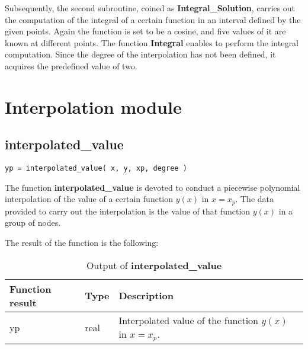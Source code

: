 Subsequently, the second subroutine, coined as \textbf{Integral\_Solution}, carries out the computation of the integral of a certain function in an interval defined by the given points. Again the function is set to be a cosine, and five values of it are known at different points. The function \textbf{Integral} enables to perform the integral computation. Since the degree of the interpolation has not been defined, it acquires the predefined value of two.

\newpage

\par\vspace{\baselineskip}
\lstset{language=Fortran}




\newpage


\section{Interpolation module}


\subsection*{interpolated\_value}


\lstset{language=Fortran}
\begin{lstlisting}[frame=trBL]
yp = interpolated_value( x, y, xp, degree )
\end{lstlisting}

The function \textbf{interpolated\_value} is devoted to conduct a piecewise polynomial interpolation of the value of a certain function $y(x)$ in $x=x_p$. The data provided to carry out the interpolation is the value of that function $y(x)$ in a group of nodes.


The result of the function is the following:

\begin{table}[H]
	\begin{center}
		\begin{spacing}{1.2}
			\begin{tabular}{| l | l | p{6cm} |}
				
				\hline
				
				\bf Function result & \bf Type & \bf Description \\ \hline \hline
				
				yp & real & Interpolated value of the function $y(x)$ in $x=x_p$.\\ \hline
				
			\end{tabular}
		\end{spacing}
	\end{center}
	\caption{Output of \textbf{interpolated\_value}}
\end{table}

